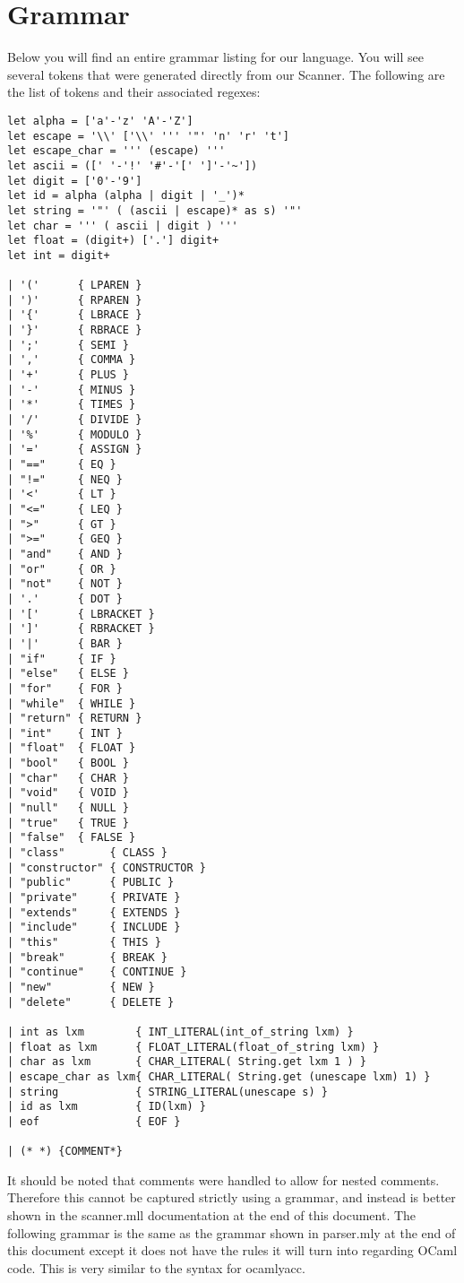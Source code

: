 \section{Grammar}
Below you will find an entire grammar listing for our language. You will see several tokens that were generated directly from our Scanner. The following are the list of tokens and their associated regexes:

\begin{verbatim}
let alpha = ['a'-'z' 'A'-'Z']
let escape = '\\' ['\\' ''' '"' 'n' 'r' 't']
let escape_char = ''' (escape) '''
let ascii = ([' '-'!' '#'-'[' ']'-'~'])
let digit = ['0'-'9']
let id = alpha (alpha | digit | '_')*
let string = '"' ( (ascii | escape)* as s) '"'
let char = ''' ( ascii | digit ) '''
let float = (digit+) ['.'] digit+
let int = digit+

| '('      { LPAREN }
| ')'      { RPAREN }
| '{'      { LBRACE }
| '}'      { RBRACE }
| ';'      { SEMI }
| ','      { COMMA }
| '+'      { PLUS }
| '-'      { MINUS }
| '*'      { TIMES }
| '/'      { DIVIDE }
| '%'      { MODULO }
| '='      { ASSIGN }
| "=="     { EQ }
| "!="     { NEQ }
| '<'      { LT }
| "<="     { LEQ }
| ">"      { GT }
| ">="     { GEQ }
| "and"    { AND }
| "or"     { OR }
| "not"    { NOT }
| '.'      { DOT }
| '['      { LBRACKET }
| ']'      { RBRACKET }
| '|'	   { BAR }
| "if"     { IF }
| "else"   { ELSE }
| "for"    { FOR }
| "while"  { WHILE }
| "return" { RETURN }
| "int"    { INT }
| "float"  { FLOAT }
| "bool"   { BOOL }
| "char"   { CHAR }
| "void"   { VOID }
| "null"   { NULL }
| "true"   { TRUE }
| "false"  { FALSE }
| "class"       { CLASS }
| "constructor" { CONSTRUCTOR }
| "public"      { PUBLIC }
| "private"     { PRIVATE }
| "extends"     { EXTENDS }
| "include"     { INCLUDE }
| "this"        { THIS }
| "break" 		{ BREAK }
| "continue"	{ CONTINUE }
| "new" 		{ NEW }
| "delete" 		{ DELETE }

| int as lxm   		{ INT_LITERAL(int_of_string lxm) }
| float as lxm 		{ FLOAT_LITERAL(float_of_string lxm) }
| char as lxm  		{ CHAR_LITERAL( String.get lxm 1 ) }
| escape_char as lxm{ CHAR_LITERAL( String.get (unescape lxm) 1) }
| string       		{ STRING_LITERAL(unescape s) }
| id as lxm    		{ ID(lxm) }
| eof          		{ EOF }

| (* *) {COMMENT*}
\end{verbatim}

It should be noted that comments were handled to allow for nested comments. Therefore this cannot be captured strictly using a grammar, and instead is better shown in the scanner.mll documentation at the end of this document. The following grammar is the same as the grammar shown in parser.mly at the end of this document except it does not have the rules it will turn into regarding OCaml code. This is very similar to the syntax for ocamlyacc. 

